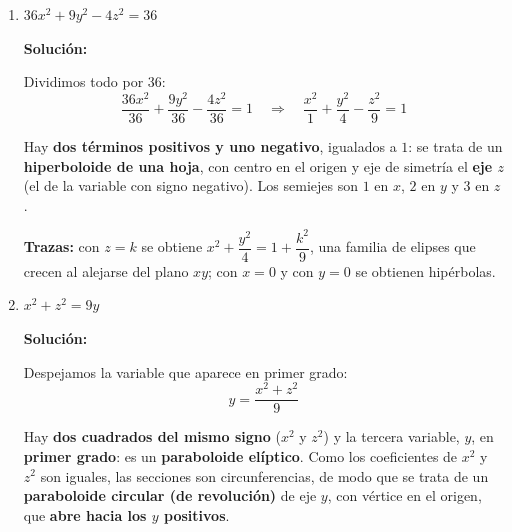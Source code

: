 \documentclass[12pt]{article}
\newcommand{\solucion}{%
    \vspace{0.8em}%
    \textbf{Solución:}%
    \vspace{0.8em}%
}
\begin{document}
\begin{enumerate}[label=\alph*.-]

    \item $36x^{2}+9y^{2}-4z^{2}=36$

    \solucion

    Dividimos todo por $36$:
    \[
    \frac{36x^{2}}{36}+\frac{9y^{2}}{36}-\frac{4z^{2}}{36}=1
    \quad\Longrightarrow\quad
    \boxed{
    \frac{x^{2}}{1}+\frac{y^{2}}{4}-\frac{z^{2}}{9}=1
    }
    \]

    Hay \textbf{dos términos positivos y uno negativo}, igualados a $1$: se
    trata de un \textbf{hiperboloide de una hoja}, con centro en el origen y
    eje de simetría el \textbf{eje $z$} (el de la variable con signo negativo).
    Los semiejes son $1$ en $x$, $2$ en $y$ y $3$ en $z$.

    \textbf{Trazas:} con $z=k$ se obtiene
    $x^{2}+\dfrac{y^{2}}{4}=1+\dfrac{k^{2}}{9}$, una familia de elipses que
    crecen al alejarse del plano $xy$; con $x=0$ y con $y=0$ se obtienen
    hipérbolas.

    \begin{center}
    \end{center}

    \item $x^{2}+z^{2}=9y$

    \solucion

    Despejamos la variable que aparece en primer grado:
    \[
    \boxed{
    y=\frac{x^{2}+z^{2}}{9}
    }
    \]

    Hay \textbf{dos cuadrados del mismo signo} ($x^{2}$ y $z^{2}$) y la tercera
    variable, $y$, en \textbf{primer grado}: es un \textbf{paraboloide
    elíptico}. Como los coeficientes de $x^{2}$ y $z^{2}$ son iguales, las
    secciones son circunferencias, de modo que se trata de un
    \textbf{paraboloide circular (de revolución)} de eje $y$, con vértice en el
    origen, que \textbf{abre hacia los $y$ positivos}.


\end{enumerate}
\end{document}
